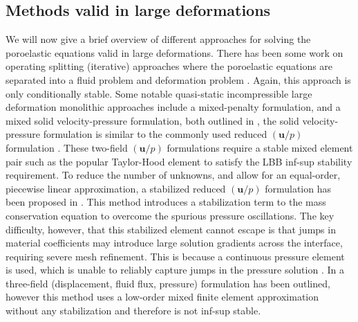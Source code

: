 \subsection{Methods valid in large deformations}


We will now give a brief overview of different approaches for solving the poroelastic equations valid in large deformations. There has been some work on operating splitting (iterative) approaches where the poroelastic equations are separated into a fluid problem and deformation problem \citep{chapelle2010poroelastic}. Again, this approach is only conditionally stable. Some notable quasi-static incompressible large deformation monolithic approaches include a mixed-penalty formulation, and a mixed solid velocity-pressure formulation, both outlined in \citep{almeida1998finite}, the solid velocity-pressure formulation is similar to the commonly used reduced $(\boldsymbol{u}/p)$ formulation \citep{ateshian2010finite}. These two-field $(\boldsymbol{u}/p)$ formulations require a stable mixed element pair such as the popular Taylor-Hood element to satisfy the LBB inf-sup stability requirement. To reduce the number of unknowns, and allow for an equal-order, piecewise linear approximation, a stabilized reduced $(\boldsymbol{u}/ p)$ formulation has been proposed in \citep{white2008stabilized}. This method introduces a stabilization term to the mass conservation equation to overcome the spurious pressure oscillations. The key difficulty, however, that this stabilized element cannot escape is that jumps in material coefficients may introduce large solution gradients across the
interface, requiring severe mesh refinement. This is because a continuous pressure element is used, which is unable to reliably capture jumps in the pressure solution \citep{white2008stabilized}. In \citep{levenston1998variationally} a three-field (displacement, fluid flux, pressure) formulation has been outlined, however this method uses a low-order mixed finite element approximation without any stabilization and therefore is not inf-sup stable.





 
